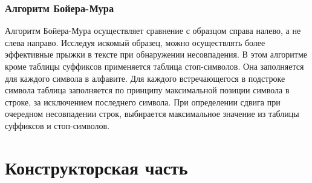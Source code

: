 \documentclass[12pt, a4paper]{report}
\begin{document}
	\subsection{Алгоритм Бойера-Мура}
	Алгоритм Бойера-Мура осуществляет сравнение с образцом справа налево, а не слева направо. Исследуя искомый образец, можно осуществлять более эффективные прыжки в тексте при обнаружении несовпадения. В этом алгоритме кроме таблицы суффиксов применяется таблица стоп-символов. Она заполняется для каждого символа в алфавите. Для каждого встречающегося в подстроке символа таблица заполняется по принципу максимальной позиции символа в строке, за исключением последнего символа. При определении сдвига при очередном несовпадении строк, выбирается максимальное значение из таблицы суффиксов и стоп-символов\cite{macconnell}.
	
	\chapter{Конструкторская часть}
	
\end{document}

